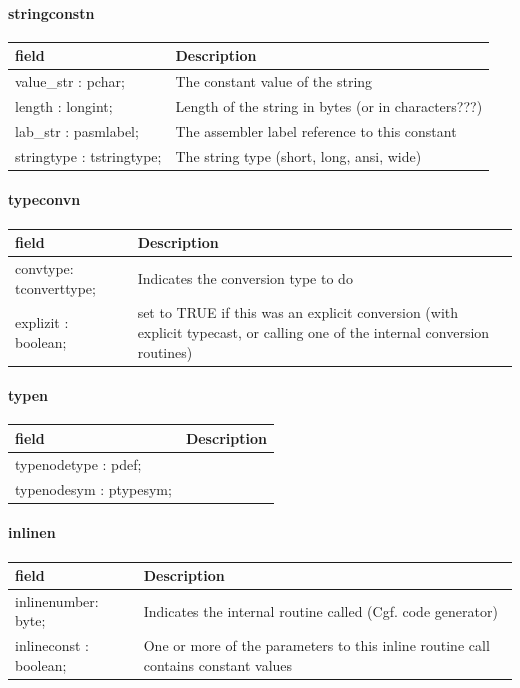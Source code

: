 \documentclass [12pt]{article}
\begin{document}
\paragraph{stringconstn}\mbox{}

\begin{longtable}{|l|p{10cm}|}
\hline
field	& Description \\
\hline
\endhead
\hline
\endfoot
\textsf{value{\_}str : pchar;}    & The constant value of the string \\
\textsf{length : longint;}	  & Length of the string in bytes (or in characters???) \\
\textsf{lab{\_}str : pasmlabel;}  & The assembler label reference to this constant \\
\textsf{stringtype : tstringtype;}& The string type (short, long, ansi, wide) 
\label{tab22}
\end{longtable}

\paragraph{typeconvn}\mbox{}

\begin{longtable}{|l|p{10cm}|}
\hline
field	& Description \\
\hline
\endhead
\hline
\endfoot
\textsf{convtype: tconverttype;}& Indicates the conversion type to do \\
\textsf{explizit : boolean;}& 
set to TRUE if this was an explicit conversion (with explicit typecast, 
or calling one of the internal conversion routines) 
\label{tab23}
\end{longtable}

\paragraph{typen}\mbox{}

\begin{longtable}{|l|p{10cm}|}
\hline
field	& Description \\
\hline
\endhead
\hline
\endfoot
\textsf{typenodetype : pdef;}&  \\
\textsf{typenodesym : ptypesym;}&  
\label{tab24}
\end{longtable}

\paragraph{inlinen}\mbox{}

\begin{longtable}{|l|p{10cm}|}
\hline
field	& Description \\
\hline
\endhead
\hline
\endfoot
\textsf{inlinenumber: byte;}    &  Indicates the internal routine called (Cgf. code generator) \\
\textsf{inlineconst : boolean;} & 
One or more of the parameters to this inline routine call contains constant values 
\label{tab25}
\end{longtable}
\end{document}
